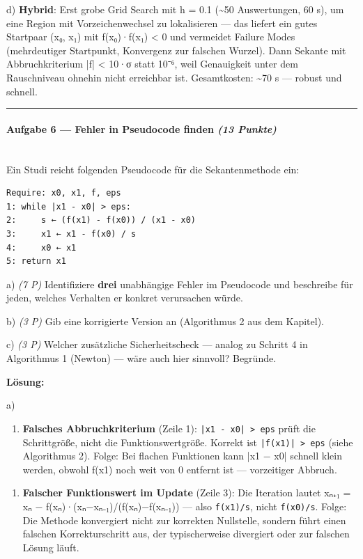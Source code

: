 \documentclass[11pt, a4paper]{article}
\begin{document}
d) \textbf{Hybrid}: Erst grobe Grid Search mit h = 0.1 (\textasciitilde{}50 Auswertungen, 60 s), um eine Region mit Vorzeichenwechsel zu lokalisieren — das liefert ein gutes Startpaar (x₀, x₁) mit f(x₀)·f(x₁) < 0 und vermeidet Failure Modes (mehrdeutiger Startpunkt, Konvergenz zur falschen Wurzel). Dann Sekante mit Abbruchkriterium |f| < 10·σ statt 10⁻⁶, weil Genauigkeit unter dem Rauschniveau ohnehin nicht erreichbar ist. Gesamtkosten: \textasciitilde{}70 s — robust und schnell.



\noindent\textcolor{rulegray}{\rule{\linewidth}{0.4pt}}


\paragraph{Aufgabe 6 — Fehler in Pseudocode finden \textit{(13 Punkte)}}\mbox{}\\[2pt]

Ein Studi reicht folgenden Pseudocode für die Sekantenmethode ein:


\begin{lstlisting}
Require: x0, x1, f, eps
1: while |x1 - x0| > eps:
2:     s ← (f(x1) - f(x0)) / (x1 - x0)
3:     x1 ← x1 - f(x0) / s
4:     x0 ← x1
5: return x1
\end{lstlisting}


a) \textit{(7 P)} Identifiziere \textbf{drei} unabhängige Fehler im Pseudocode und beschreibe für jeden, welches Verhalten er konkret verursachen würde.


b) \textit{(3 P)} Gib eine korrigierte Version an (Algorithmus 2 aus dem Kapitel).


c) \textit{(3 P)} Welcher zusätzliche Sicherheitscheck — analog zu Schritt 4 in Algorithmus 1 (Newton) — wäre auch hier sinnvoll? Begründe.


\textbf{Lösung:}


a)

\begin{enumerate}
  \item \textbf{Falsches Abbruchkriterium} (Zeile 1): \texttt{|x1 - x0| > eps} prüft die Schrittgröße, nicht die Funktionswertgröße. Korrekt ist \texttt{|f(x1)| > eps} (siehe Algorithmus 2). Folge: Bei flachen Funktionen kann |x1 − x0| schnell klein werden, obwohl f(x1) noch weit von 0 entfernt ist — vorzeitiger Abbruch.
\end{enumerate}

\begin{enumerate}
  \item \textbf{Falscher Funktionswert im Update} (Zeile 3): Die Iteration lautet xₙ₊₁ = xₙ − f(xₙ)·(xₙ−xₙ₋₁)/(f(xₙ)−f(xₙ₋₁)) — also \texttt{f(x1)/s}, nicht \texttt{f(x0)/s}. Folge: Die Methode konvergiert nicht zur korrekten Nullstelle, sondern führt einen falschen Korrekturschritt aus, der typischerweise divergiert oder zur falschen Lösung läuft.
\end{enumerate}
\end{document}
